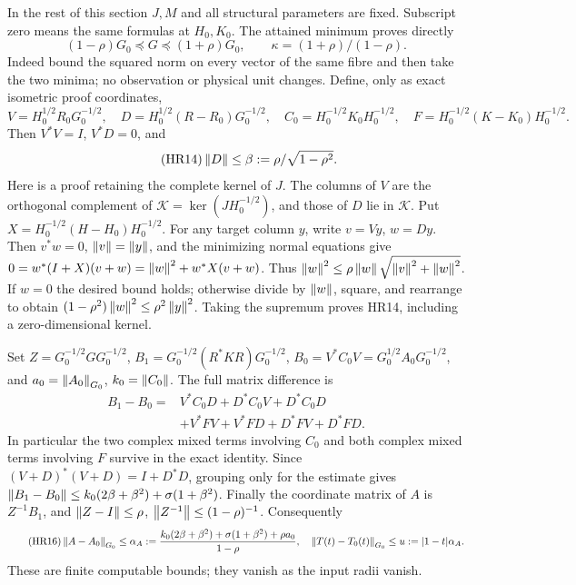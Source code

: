 \documentclass[11pt]{article}
\begin{document}
In the rest of this section \(J,M\) and all structural parameters
are fixed. Subscript zero means the same formulas at \(H_0,K_0\).
The attained minimum proves directly
\begin{equation}\tag{HR13}\label{hrv:HR13}
(1-\rho)G_0\preceq G\preceq(1+\rho)G_0,\qquad
\kappa=(1+\rho)/(1-\rho).
\end{equation}
Indeed bound the squared norm on every vector of the same fibre
and then take the two minima; no observation or physical unit changes.
Define, only as exact isometric proof coordinates,
\[
V=H_0^{1/2}R_0G_0^{-1/2},\quad
D=H_0^{1/2}(R-R_0)G_0^{-1/2},\quad
C_0=H_0^{-1/2}K_0H_0^{-1/2},\quad
F=H_0^{-1/2}(K-K_0)H_0^{-1/2}.
\]
Then \(V^*V=I\), \(V^*D=0\), and
\begin{equation}\tag{HR14}\label{hrv:HR14}
\left\lVert D\right\rVert\le\beta:=\rho/\sqrt{1-\rho^2}.
\end{equation}
Here is a proof retaining the complete kernel of \(J\).
The columns of \(V\) are the orthogonal complement of
\(\mathcal K=\ker(JH_0^{-1/2})\), and those of \(D\) lie in \(\mathcal K\).
Put \(X=H_0^{-1/2}(H-H_0)H_0^{-1/2}\). For any target column \(y\),
write \(v=Vy\), \(w=Dy\). Then \(v^*w=0\), \(\left\lVert v\right\rVert=\left\lVert y\right\rVert\),
and the minimizing normal equations give
\(0=w^*(I+X)(v+w)=\left\lVert w\right\rVert^2+w^*X(v+w)\).
Thus \(\left\lVert w\right\rVert^2\le\rho\left\lVert w\right\rVert\sqrt{\left\lVert v\right\rVert^2+\left\lVert w\right\rVert^2}\).
If \(w=0\) the desired bound holds; otherwise divide by \(\left\lVert w\right\rVert\),
square, and rearrange to obtain
\((1-\rho^2)\left\lVert w\right\rVert^2\le\rho^2\left\lVert y\right\rVert^2\).
Taking the supremum proves HR14, including a zero-dimensional kernel.

Set \(Z=G_0^{-1/2}GG_0^{-1/2}\),
\(B_1=G_0^{-1/2}(R^*KR)G_0^{-1/2}\),
\(B_0=V^*C_0V=G_0^{1/2}A_0G_0^{-1/2}\), and \(a_0=\left\lVert A_0\right\rVert_{G_0}\),
\(k_0=\left\lVert C_0\right\rVert\). The full matrix difference is
\begin{equation}\tag{HR15}\label{hrv:HR15}
\begin{split}
B_1-B_0={}&V^*C_0D+D^*C_0V+D^*C_0D\\
&+V^*FV+V^*FD+D^*FV+D^*FD.
\end{split}
\end{equation}
In particular the two complex mixed terms involving \(C_0\) and both
complex mixed terms involving \(F\) survive in the exact identity.
Since \((V+D)^*(V+D)=I+D^*D\), grouping only for the estimate gives
\(\left\lVert B_1-B_0\right\rVert\le k_0(2\beta+\beta^2)+\sigma(1+\beta^2)\).
Finally the coordinate matrix of \(A\) is \(Z^{-1}B_1\), and
\(\left\lVert Z-I\right\rVert\le\rho\), \(\left\lVert Z^{-1}\right\rVert\le(1-\rho)^{-1}\).
Consequently
\begin{equation}\tag{HR16}\label{hrv:HR16}
\left\lVert A-A_0\right\rVert_{G_0}\le
\alpha_A:=\frac{k_0(2\beta+\beta^2)+\sigma(1+\beta^2)+\rho a_0}
{1-\rho},\quad
\left\lVert T(t)-T_0(t)\right\rVert_{G_0}\le u:=|1-t|\alpha_A.
\end{equation}
These are finite computable bounds; they vanish as the input radii vanish.
\end{document}
